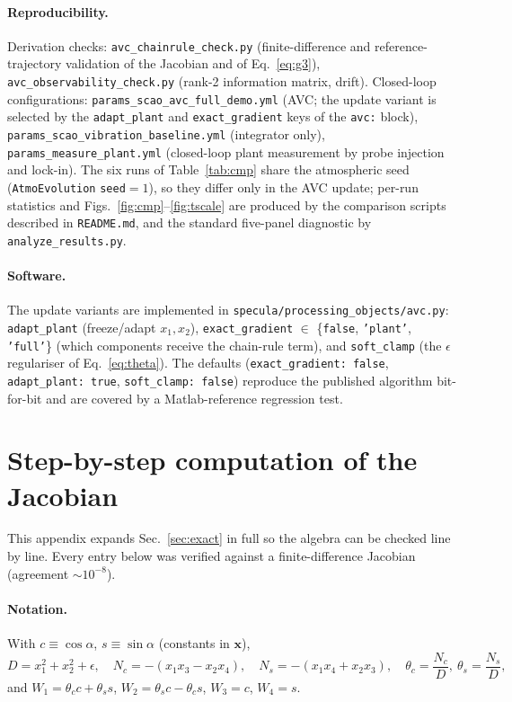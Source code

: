 \documentclass[11pt]{article}
\newcommand{\vx}{\mathbf{x}}
\begin{document}
\paragraph{Reproducibility.}
Derivation checks: \texttt{avc\_chainrule\_check.py} (finite-difference and
reference-trajectory validation of the Jacobian and of
Eq.~\eqref{eq:g3}), \texttt{avc\_observability\_check.py} (rank-2
information matrix, drift). Closed-loop configurations:
\texttt{params\_scao\_avc\_full\_demo.yml} (AVC; the update variant is
selected by the \texttt{adapt\_plant} and \texttt{exact\_gradient} keys of
the \texttt{avc:} block), \texttt{params\_scao\_vibration\_baseline.yml}
(integrator only), \texttt{params\_measure\_plant.yml} (closed-loop plant
measurement by probe injection and lock-in). The six runs of
Table~\ref{tab:cmp} share the atmospheric seed (\texttt{AtmoEvolution}
\texttt{seed}$=1$), so they differ only in the AVC update; per-run
statistics and Figs.~\ref{fig:cmp}--\ref{fig:tscale} are produced by the
comparison scripts described in \texttt{README.md}, and the standard
five-panel diagnostic by \texttt{analyze\_results.py}.

\paragraph{Software.}
The update variants are implemented in
\texttt{specula/processing\_objects/avc.py}: \texttt{adapt\_plant}
(freeze/adapt $x_1,x_2$), \texttt{exact\_gradient} $\in$
\{\texttt{false}, \texttt{'plant'}, \texttt{'full'}\} (which components
receive the chain-rule term), and \texttt{soft\_clamp} (the $\epsilon$
regulariser of Eq.~\eqref{eq:theta}). The defaults
(\texttt{exact\_gradient:\ false}, \texttt{adapt\_plant:\ true},
\texttt{soft\_clamp:\ false}) reproduce the published algorithm bit-for-bit
and are covered by a Matlab-reference regression test.

\appendix
\section{Step-by-step computation of the Jacobian}
\label{app:jac}

This appendix expands Sec.~\ref{sec:exact} in full so the algebra can be
checked line by line. Every entry below was verified against a
finite-difference Jacobian (agreement $\sim\!10^{-8}$).

\paragraph{Notation.}
With $c\equiv\cos\alpha$, $s\equiv\sin\alpha$ (constants in $\vx$),
\begin{equation}
  D = x_1^2+x_2^2+\epsilon,\quad
  N_c=-(x_1x_3-x_2x_4),\quad
  N_s=-(x_1x_4+x_2x_3),\quad
  \theta_c=\frac{N_c}{D},\ \theta_s=\frac{N_s}{D},
\end{equation}
and $W_1=\theta_c c+\theta_s s$, $W_2=\theta_s c-\theta_c s$, $W_3=c$, $W_4=s$.
\end{document}
